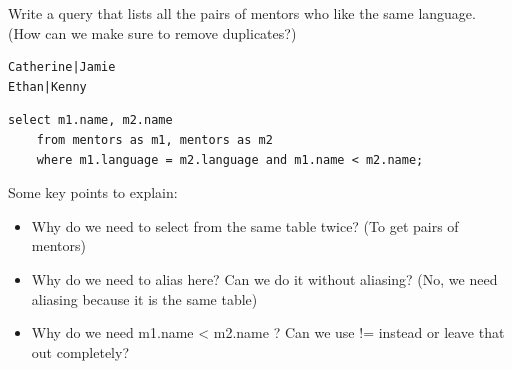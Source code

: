 \begin{blocksection}
Write a query that lists all the pairs of mentors who like the same language. (How can we make sure to remove duplicates?)

\begin{lstlisting}
Catherine|Jamie
Ethan|Kenny
\end{lstlisting}

\begin{solution}
\begin{lstlisting}
select m1.name, m2.name
    from mentors as m1, mentors as m2
    where m1.language = m2.language and m1.name < m2.name;
\end{lstlisting}
\end{solution}
\end{blocksection}

\begin{guide}
\begin{blocksection}
Some key points to explain:
\begin{itemize}
	\item Why do we need to select from the same table twice? (To get pairs of mentors)
	\item Why do we need to alias here? Can we do it without aliasing? (No, we need aliasing because it is the same table)
	\item Why do we need m1.name < m2.name ? Can we use != instead or leave that out completely?
\end{itemize}
\end{blocksection}
\end{guide}
